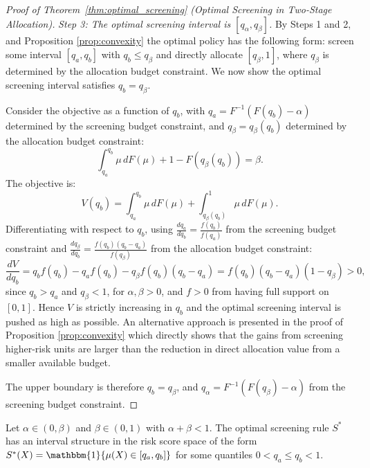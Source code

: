 \begin{proof}[Proof of Theorem~\ref{thm:optimal_screening} (Optimal Screening in Two-Stage Allocation)]
\textit{Step 3: The optimal screening interval is $[q_\alpha, q_\beta]$.} By Steps 1 and 2, and Proposition \ref{prop:convexity} the optimal policy has the following form: screen some interval $[q_a, q_b]$ with $q_b \leq q_\beta$ and directly allocate $[q_\beta, 1]$, where $q_\beta$ is determined by the allocation budget constraint. We now show the optimal screening interval satisfies $q_b = q_\beta$.

Consider the objective as a function of $q_b$, with $q_a = F^{-1}(F(q_b) - \alpha)$ determined by the screening budget constraint, and $q_\beta = q_\beta(q_b)$ determined by the allocation budget constraint:
\begin{equation}
    \int_{q_a}^{q_b} \mu \, dF(\mu) + 1 - F(q_\beta(q_b)) = \beta.
\end{equation}
The objective is:
\begin{equation}
    V(q_b) = \int_{q_a}^{q_b} \mu \, dF(\mu) + \int_{q_\beta(q_b)}^{1} \mu \, dF(\mu).
\end{equation}
Differentiating with respect to $q_b$, using $\frac{dq_a}{dq_b} = \frac{f(q_b)}{f(q_a)}$ from the screening budget constraint and $\frac{dq_\beta}{dq_b} = \frac{f(q_b)(q_b - q_a)}{f(q_\beta)}$ from the allocation budget constraint:
\begin{equation}
    \frac{dV}{dq_b} = q_b f(q_b) - q_a f(q_b) - q_\beta f(q_b)(q_b - q_a) = f(q_b)(q_b - q_a)(1 - q_\beta) > 0,
\end{equation}
since $q_b > q_a$ and $q_\beta < 1$, for $\alpha, \beta > 0$, and $f > 0$ from having full support on $[0,1]$. Hence $V$ is strictly increasing in $q_b$ and the optimal screening interval is pushed as high as possible. An alternative approach is presented in the proof of Proposition \ref{prop:convexity} which directly shows that the gains from screening higher-risk units are larger than the reduction in direct allocation value from a smaller available budget.

The upper boundary is therefore $q_b = q_\beta$, and $q_\alpha = F^{-1}(F(q_\beta) - \alpha)$ from the screening budget constraint.
\end{proof}

\begin{proposition}
\label{prop:convexity}
Let $\alpha \in (0,\beta)$ and $\beta \in (0,1)$ with $\alpha + \beta < 1$. The optimal screening rule $S^*$ has an interval structure in the risk score space of the form $S^*(X) = \mathbbm{1}\{\mu(X) \in [q_a, q_b]\}$ for some quantiles $0 < q_a \leq q_b < 1$.
\end{proposition}

